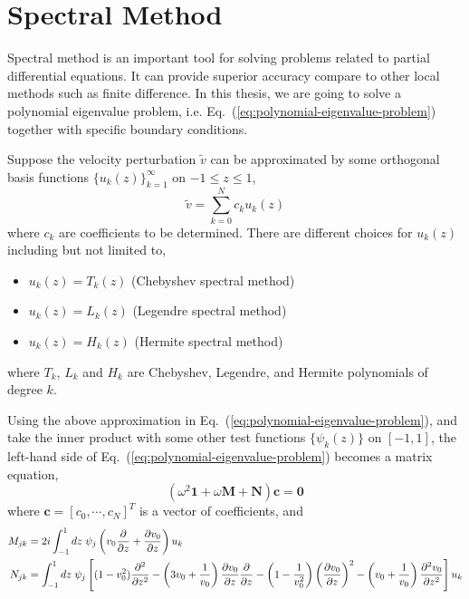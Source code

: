 \chapter{Spectral Method} \label{chap:spectral-method}
Spectral method is an important tool for solving problems related to partial differential equations. It can provide superior accuracy compare to other local methods such as finite difference. \cite{shen_tang_etal_spectral_2011} In this thesis, we are going to solve a polynomial eigenvalue problem, i.e. Eq.~(\ref{eq:polynomial-eigenvalue-problem}) together with specific boundary conditions.

Suppose the velocity perturbation $\tilde{v}$ can be approximated by some orthogonal basis functions $\{u_k(z)\}_{k=1}^{\infty}$ on $-1\leq z\leq 1$,
\begin{equation}
	\tilde{v} = \sum_{k=0}^{N} c_ku_k(z)
\end{equation}
where $c_k$ are coefficients to be determined. There are different choices for $u_k(z)$ including but not limited to, \cite{shen_tang_etal_spectral_2011}
\begin{itemize}
	\item $u_k(z)=T_k(z)$ (Chebyshev spectral method)
	\item $u_k(z)=L_k(z)$ (Legendre spectral method)
	\item $u_k(z)=H_k(z)$ (Hermite spectral method)
\end{itemize}
where $T_k$, $L_k$ and $H_k$ are Chebyshev, Legendre, and Hermite polynomials of degree $k$.

Using the above approximation in Eq.~(\ref{eq:polynomial-eigenvalue-problem}), and take the inner product with some other test functions $\{\psi_k(z)\}$ on $[-1,1]$, the left-hand side of Eq.~(\ref{eq:polynomial-eigenvalue-problem}) becomes a matrix equation,
\begin{equation}
	(\omega^2\mathbf{1} + \omega\mathbf{M} + \mathbf{N})\mathbf{c} = \mathbf{0}
	\label{eq:pep-matrix-equation}
\end{equation}
where $\mathbf{c} = [c_0, \cdots, c_N]^T$ is a vector of coefficients, and
\begin{equation}
	\begin{aligned}
		M_{jk} & = 2i\int_{-1}^{1}dz \; \psi_{j}\left(v_0\pdv{}{z} +\pdv{v_0}{z} \right)u_{k} \\
		N_{jk} & = \int_{-1}^{1}dz \; \psi_{j} \left[(1-v_0^2)\pdv[2]{}{z}
			-\left(3v_0 + \frac{1}{v_0}\right)\pdv{v_0}{z}\pdv{}{z}
			- \left(1-\frac{1}{v_0^2}\right)\left(\pdv{v_0}{z}\right)^2
			- \left(v_0+\frac{1}{v_0}\right)\pdv[2]{v_0}{z}\right] u_{k}
	\end{aligned}
	\label{eq:operator-matrix}
\end{equation}

